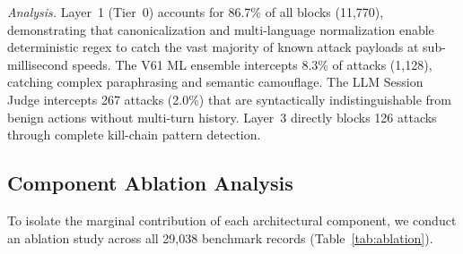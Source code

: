 \documentclass[conference]{IEEEtran}
\begin{document}
\textit{Analysis.} Layer~1 (Tier~0) accounts for 86.7\% of all blocks (11,770), demonstrating that canonicalization and multi-language normalization enable deterministic regex to catch the vast majority of known attack payloads at sub-millisecond speeds. The V61 ML ensemble intercepts 8.3\% of attacks (1,128), catching complex paraphrasing and semantic camouflage. The LLM Session Judge intercepts 267 attacks (2.0\%) that are syntactically indistinguishable from benign actions without multi-turn history. Layer~3 directly blocks 126 attacks through complete kill-chain pattern detection.

\subsection{Component Ablation Analysis}
To isolate the marginal contribution of each architectural component, we conduct an ablation study across all 29,038 benchmark records (Table~\ref{tab:ablation}).

\begin{table}[t]
\caption{Component Ablation Study on Benchmark Dataset}
\label{tab:ablation}
\centering
{}
\end{table}
\end{document}
